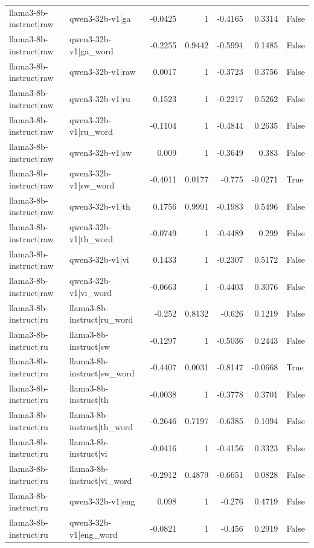 \begin{table}
\begin{tabular}{l l r r r r l}
llama3-8b-instruct|raw & qwen3-32b-v1|ga & -0.0425 & 1 & -0.4165 & 0.3314 & False \\
llama3-8b-instruct|raw & qwen3-32b-v1|ga_word & -0.2255 & 0.9442 & -0.5994 & 0.1485 & False \\
llama3-8b-instruct|raw & qwen3-32b-v1|raw & 0.0017 & 1 & -0.3723 & 0.3756 & False \\
llama3-8b-instruct|raw & qwen3-32b-v1|ru & 0.1523 & 1 & -0.2217 & 0.5262 & False \\
llama3-8b-instruct|raw & qwen3-32b-v1|ru_word & -0.1104 & 1 & -0.4844 & 0.2635 & False \\
llama3-8b-instruct|raw & qwen3-32b-v1|sw & 0.009 & 1 & -0.3649 & 0.383 & False \\
llama3-8b-instruct|raw & qwen3-32b-v1|sw_word & -0.4011 & 0.0177 & -0.775 & -0.0271 & True \\
llama3-8b-instruct|raw & qwen3-32b-v1|th & 0.1756 & 0.9991 & -0.1983 & 0.5496 & False \\
llama3-8b-instruct|raw & qwen3-32b-v1|th_word & -0.0749 & 1 & -0.4489 & 0.299 & False \\
llama3-8b-instruct|raw & qwen3-32b-v1|vi & 0.1433 & 1 & -0.2307 & 0.5172 & False \\
llama3-8b-instruct|raw & qwen3-32b-v1|vi_word & -0.0663 & 1 & -0.4403 & 0.3076 & False \\
llama3-8b-instruct|ru & llama3-8b-instruct|ru_word & -0.252 & 0.8132 & -0.626 & 0.1219 & False \\
llama3-8b-instruct|ru & llama3-8b-instruct|sw & -0.1297 & 1 & -0.5036 & 0.2443 & False \\
llama3-8b-instruct|ru & llama3-8b-instruct|sw_word & -0.4407 & 0.0031 & -0.8147 & -0.0668 & True \\
llama3-8b-instruct|ru & llama3-8b-instruct|th & -0.0038 & 1 & -0.3778 & 0.3701 & False \\
llama3-8b-instruct|ru & llama3-8b-instruct|th_word & -0.2646 & 0.7197 & -0.6385 & 0.1094 & False \\
llama3-8b-instruct|ru & llama3-8b-instruct|vi & -0.0416 & 1 & -0.4156 & 0.3323 & False \\
llama3-8b-instruct|ru & llama3-8b-instruct|vi_word & -0.2912 & 0.4879 & -0.6651 & 0.0828 & False \\
llama3-8b-instruct|ru & qwen3-32b-v1|eng & 0.098 & 1 & -0.276 & 0.4719 & False \\
llama3-8b-instruct|ru & qwen3-32b-v1|eng_word & -0.0821 & 1 & -0.456 & 0.2919 & False \\

\end{tabular}
\end{table}
